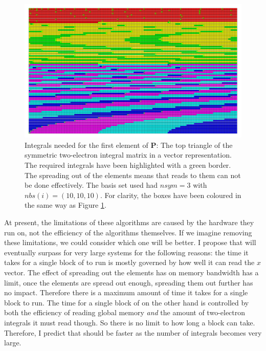 \begin{figure}
\includegraphics[width=1\textwidth]{Figures/eint2_vec_lots.png}
\caption[Integrals needed for the first element of \textbf{P}: vector representation]
{Integrals needed for the first element of \textbf{P}: The top triangle of the symmetric two-electron integral matrix in a vector representation. The required integrals have been highlighted with a green border.  The spreading out of the elements means that reads to them can not be done effectively. The basis set used had $nsym=3$ with $nbs(i) = (10, 10, 10)$. For clarity, the boxes have been coloured in the same way as Figure \ref{fig:eint2matlots}.}
\label{fig:eint2matlots}
\end{figure}


At present, the limitations of these algorithms are caused by the hardware they run on, not the efficiency of the algorithms themselves. If we imagine removing these limitations, we could consider which one will be better. I propose that  will eventually surpass  for very large systems for the following reasons: the time it takes for a single block of  to run is mostly governed by how well it can read the $x$ vector. The effect of spreading out the elements has on memory bandwidth has a limit, once the elements are spread out enough, spreading them out further has no impact. Therefore there is a maximum amount of time it takes for a single block to run. The time for a single block of  on the other hand is controlled by both the efficiency of reading global memory \textit{and} the amount of two-electron integrals it must read though. So there is no limit to how long a block can take. Therefore, I predict that  should be faster as the number of integrals becomes very large.

